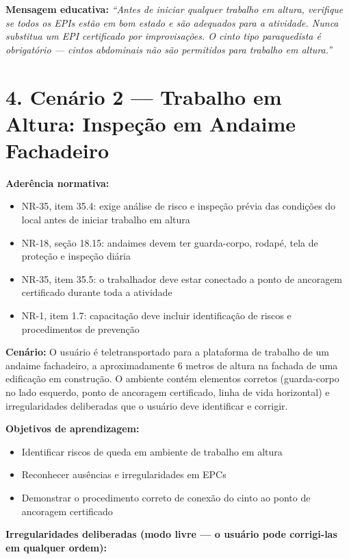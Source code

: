 \textbf{Mensagem educativa:} \textit{``Antes de iniciar qualquer trabalho em altura, verifique se todos os EPIs estão em bom estado e são adequados para a atividade. Nunca substitua um EPI certificado por improvisações. O cinto tipo paraquedista é obrigatório --- cintos abdominais não são permitidos para trabalho em altura.''}

\section*{4. Cenário 2 --- Trabalho em Altura: Inspeção em Andaime Fachadeiro}

\textbf{Aderência normativa:}
\begin{itemize}
    \item NR-35, item 35.4: exige análise de risco e inspeção prévia das condições do local antes de iniciar trabalho em altura
    \item NR-18, seção 18.15: andaimes devem ter guarda-corpo, rodapé, tela de proteção e inspeção diária
    \item NR-35, item 35.5: o trabalhador deve estar conectado a ponto de ancoragem certificado durante toda a atividade
    \item NR-1, item 1.7: capacitação deve incluir identificação de riscos e procedimentos de prevenção
\end{itemize}

\textbf{Cenário:} O usuário é teletransportado para a plataforma de trabalho de um andaime fachadeiro, a aproximadamente 6 metros de altura na fachada de uma edificação em construção. O ambiente contém elementos corretos (guarda-corpo no lado esquerdo, ponto de ancoragem certificado, linha de vida horizontal) e irregularidades deliberadas que o usuário deve identificar e corrigir.

\textbf{Objetivos de aprendizagem:}

\begin{itemize}
    \item Identificar riscos de queda em ambiente de trabalho em altura
    \item Reconhecer ausências e irregularidades em EPCs
    \item Demonstrar o procedimento correto de conexão do cinto ao ponto de ancoragem certificado
\end{itemize}

\textbf{Irregularidades deliberadas (modo livre --- o usuário pode corrigi-las em qualquer ordem):}

